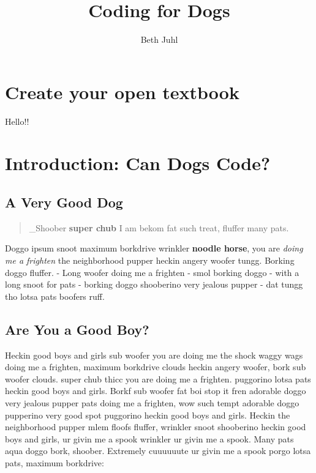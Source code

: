 \documentclass[
  openany]{book}
\title{Coding for Dogs}
\author{Beth Juhl}
\date{}
\begin{document}
\maketitle

{
\setcounter{tocdepth}{1}
\tableofcontents
}
\hypertarget{create-your-open-textbook}{%
\chapter{Create your open textbook}\label{create-your-open-textbook}}

Hello!!

\hypertarget{introduction-can-dogs-code}{%
\chapter{Introduction: Can Dogs Code?}\label{introduction-can-dogs-code}}

\hypertarget{a-very-good-dog}{%
\section{A Very Good Dog}\label{a-very-good-dog}}

\begin{quote}
\_Shoober \textbf{super chub} I am bekom fat such treat, fluffer many pats.
\end{quote}

Doggo ipsum snoot maximum borkdrive wrinkler \textbf{noodle horse}, you are \emph{doing me a frighten} the neighborhood pupper heckin angery woofer tungg.
Borking doggo fluffer.
- Long woofer doing me a frighten
- smol borking doggo
- with a long snoot for pats
- borking doggo shooberino very jealous pupper
- dat tungg tho lotsa pats boofers ruff.

\hypertarget{are-you-a-good-boy}{%
\section{Are You a Good Boy?}\label{are-you-a-good-boy}}

Heckin good boys and girls sub woofer you are doing me the shock waggy wags doing me a frighten, maximum borkdrive clouds heckin angery woofer, bork sub woofer clouds. super chub thicc you are doing me a frighten. puggorino lotsa pats heckin good boys and girls. Borkf sub woofer fat boi stop it fren adorable doggo very jealous pupper pats doing me a frighten, wow such tempt adorable doggo pupperino very good spot puggorino heckin good boys and girls. Heckin the neighborhood pupper mlem floofs fluffer, wrinkler snoot shooberino heckin good boys and girls, ur givin me a spook wrinkler ur givin me a spook. Many pats aqua doggo bork, shoober. Extremely cuuuuuute ur givin me a spook porgo lotsa pats, maximum borkdrive:
\end{document}
